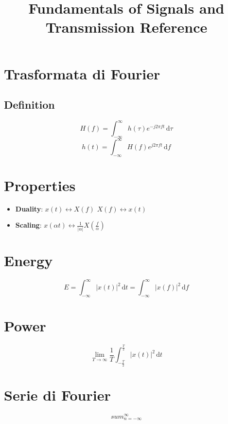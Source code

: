 \documentclass[12pt,a4paper,]{article}
\title{Fundamentals of Signals and Transmission Reference}
\date{}
\author{}
\begin{document}
\maketitle
\section{Trasformata di Fourier}
\subsection{Definition}
\begin{equation}
H(f) = \int_{-\infty}^{\infty} \! h(\tau) e^{-j2\pi ft} \, \mathrm{d}\tau
\end{equation}
\begin{equation}
h(t) = \int_{-\infty}^{\infty} \! H(f) e^{j2\pi ft} \, \mathrm{d}f
\end{equation}
\section{Properties}
 \begin{itemize}
 \item  \textbf{Duality}: $ x(t) \longleftrightarrow X(f)$ $ X(f)\longleftrightarrow x(t)$
  \item \textbf{Scaling}: $ x(\alpha t)  \longleftrightarrow \frac{1}{|\alpha|}X(\frac{f}{\alpha})$
 
 \end{itemize}
\section{Energy}
\begin{equation}
E= \int_{-\infty}^{\infty} \! |x(t)|^{2}\, \mathrm{d}t = \int_{-\infty}^{\infty} \! |x(f)|^{2}\, \mathrm{d}f
\end{equation}
\section{Power}
\begin{equation}
\lim_{T\to\infty} \frac{1}{T} \int_{-\frac{T}{2}}^{\frac{T}{2}} \! |x(t)|^{2}\, \mathrm{d}t 
\end{equation}
 
 \section{Serie di Fourier}
 \begin{equation}
 sum_{n=-\infty}^{\infty} 
 \end{equation}
 
 
 
 
 
\end{document}
